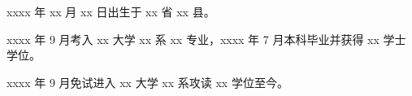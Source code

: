 \begin{resume}


  xxxx 年 xx 月 xx 日出生于 xx 省 xx 县。

  xxxx 年 9 月考入 xx 大学 xx 系 xx 专业，xxxx 年 7 月本科毕业并获得 xx 学士学位。

  xxxx 年 9 月免试进入 xx 大学 xx 系攻读 xx 学位至今。






\end{resume}
